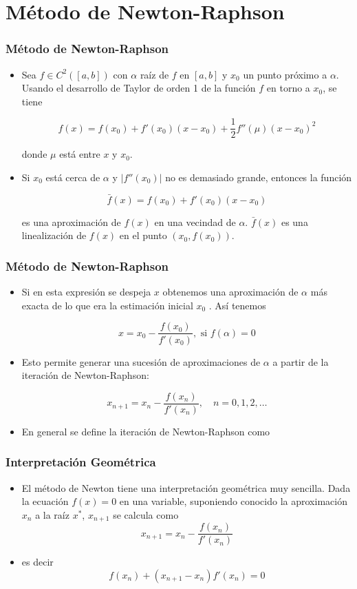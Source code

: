 \documentclass{beamer}
\begin{document}
\section{M\'etodo de Newton-Raphson}
\begin{frame}
  \frametitle{M\'etodo de Newton-Raphson}
  \begin{itemize}
    \item<1-> Sea $f \in C^2 ([a, b])$ con $\alpha$ ra\'iz de $f$ en $[a,b]$ y $x_0$ un punto pr\'oximo a $\alpha$. Usando el desarrollo de Taylor de orden 1 de la funci\'on $f$ en torno a $x_0$, se tiene
    \begin{block}{}
    $$
      f(x) = f(x_0) + f'(x_0)(x-x_0) + \frac{1}{2}f''(\mu)(x-x_0)^2
    $$  
    \end{block}
    donde $\mu$ est\'a entre $x$ y $x_0$.
    \item<2-> Si $x_0$ est\'a cerca de $\alpha$ y $|f''(x_0)|$ no es demasiado grande, entonces la funci\'on
    \begin{block}{}
      $$
    \bar f(x) = f(x_0) + f'(x_0)(x-x_0)
    $$      
    \end{block}
    es una aproximaci\'on de $f(x)$ en una vecindad de $\alpha$. $\bar f(x)$ es una linealizaci\'on de $f(x)$ en el punto $(x_0 , f(x_0))$.
  \end{itemize}
\end{frame}
\begin{frame}
  \frametitle{M\'etodo de Newton-Raphson}
  \begin{itemize}
    \item<1-> Si en esta expresi\'on se despeja $x$ obtenemos una aproximaci\'on de $\alpha$ m\'as exacta de lo que era la estimaci\'on inicial $x_0$ . As\'i tenemos
    \begin{block}{}
    $$
    x = x_0 - \frac{f(x_0)}{f'(x_0)}, \textrm{ si } f(\alpha) = 0
    $$
    \end{block}
    \item<2-> Esto permite generar una sucesi\'on de aproximaciones de $\alpha$ a partir de la iteraci\'on de Newton-Raphson:
    \begin{block}{}
    $$
    x_{n+1} = x_n - \frac{f(x_n)}{f'(x_n)}, \quad n=0,1,2,\ldots
    $$    
    \end{block}
    \item<3-> En general se define la iteraci\'on de Newton-Raphson como 
    \end{itemize}
\end{frame}
\begin{frame}
  \frametitle{Interpretaci\'on Geom\'etrica}
  \begin{itemize}
    \item<1-> El m\'etodo de Newton tiene una interpretaci\'on geom\'etrica muy sencilla. Dada la ecuaci\'on $f(x) = 0$ en una
    variable, suponiendo conocido la aproximaci\'on $x_n$ a la ra\'iz $x^*$, $x_{n+1}$ se calcula como
    $$
    x_{n+1} = x_n - \frac{f(x_n)}{f'(x_n)}
    $$
    
    \item<2->es decir
    $$
    f(x_n) + (x_{n+1} - x_n)f'(x_n) = 0
    $$    
  \end{itemize}
\end{frame}
\end{document}
